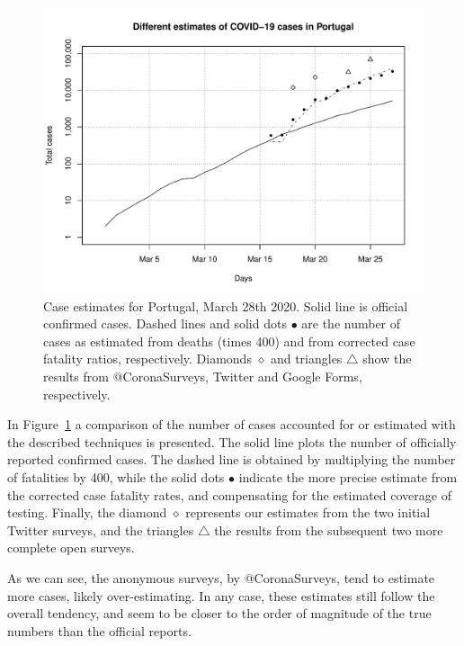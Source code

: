 \documentclass{article}
\begin{document}
\begin{figure}
\begin{center}
\includegraphics[width=0.9\linewidth]{EstPTMar28.pdf}
\end{center}
  \caption{Case estimates for Portugal, March 28th 2020. Solid line is official confirmed cases. Dashed lines and solid dots $\bullet$ are the number of cases as estimated from deaths (times 400) and from corrected case fatality ratios, respectively. Diamonds $\diamond$ and triangles  $\triangle$ show the results from $@$CoronaSurveys, Twitter and Google Forms, respectively.}
\label{pt}
\end{figure}

In Figure~\ref{pt} a comparison of the number of cases accounted for or estimated with the described techniques is presented. The solid line plots the number of officially reported confirmed cases. The dashed line is obtained by multiplying the number of fatalities by 400, while the solid dots $\bullet$ indicate the more precise estimate from the corrected case fatality rates, and compensating for the estimated coverage of testing. Finally, the diamond $\diamond$ represents our estimates from the two initial Twitter surveys, and the triangles $\triangle$ the results from the subsequent two more complete open surveys. 

As we can see, the anonymous surveys, by $@$CoronaSurveys, tend to estimate more cases, likely over-estimating. In any case, these estimates still follow the overall tendency, and seem to be closer to the order of magnitude of the true numbers than the official reports. 
\end{document}
